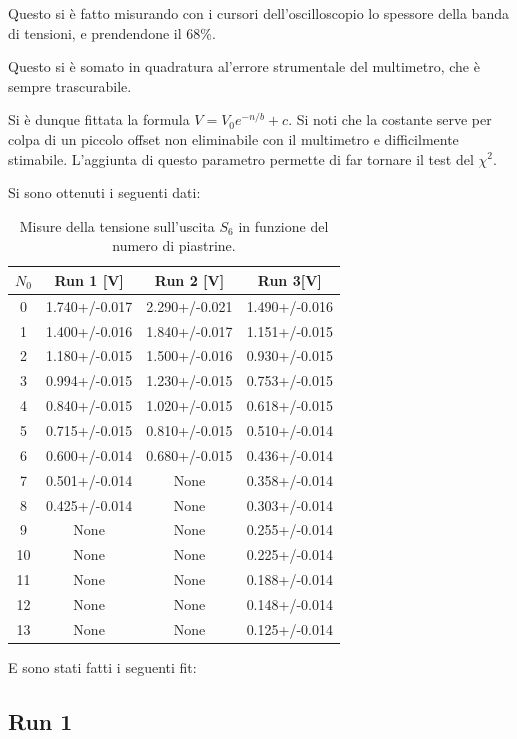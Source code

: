 \documentclass[a4paper,10pt]{article}
\begin{document}
Questo si è fatto misurando con i cursori dell'oscilloscopio lo spessore della banda di tensioni, e prendendone il 68\%. %


Questo si è somato in quadratura al'errore strumentale del multimetro, che è sempre trascurabile. 

Si è dunque fittata la formula $V=V_0e^{-n/b}+c$. Si noti che la costante serve per colpa di un piccolo offset non eliminabile con il multimetro e difficilmente stimabile. L'aggiunta di questo parametro permette di far tornare il test del $\chi^2$. 

Si sono ottenuti i seguenti dati:

\begin{table}[H]
	\centering
	\begin{tabular}{cccc}
		$ N_0 $ & Run 1 [V]& Run 2 [V]& Run 3[V]\\
		\hline
		0 & 1.740+/-0.017 & 2.290+/-0.021 & 1.490+/-0.016\\
		1 & 1.400+/-0.016 & 1.840+/-0.017 & 1.151+/-0.015\\
		2 & 1.180+/-0.015 & 1.500+/-0.016 & 0.930+/-0.015\\
		3 & 0.994+/-0.015 & 1.230+/-0.015 & 0.753+/-0.015\\
		4 & 0.840+/-0.015 & 1.020+/-0.015 & 0.618+/-0.015\\
		5 & 0.715+/-0.015 & 0.810+/-0.015 & 0.510+/-0.014\\
		6 & 0.600+/-0.014 & 0.680+/-0.015 & 0.436+/-0.014\\
		7 & 0.501+/-0.014 & None & 0.358+/-0.014\\
		8 & 0.425+/-0.014 & None & 0.303+/-0.014\\
		9 & None & None & 0.255+/-0.014\\
		10 & None & None & 0.225+/-0.014\\
		11 & None & None & 0.188+/-0.014\\
		12 & None & None & 0.148+/-0.014\\
		13 & None & None & 0.125+/-0.014\\	
	\end{tabular}
\caption{Misure della tensione sull'uscita $ S_6 $ in funzione del numero di piastrine.}
\label{tab:s6}
\end{table}

E sono stati fatti i seguenti fit:

\subsection{Run 1}
\end{document}
